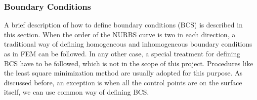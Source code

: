 \documentclass[11pt]{article}
\begin{document}
\begin{enumerate}[leftmargin=*]
	
	\begin{verbatim}

	\end{verbatim}
\end{enumerate}
\subsubsection{Boundary Conditions}
A brief description of how to define boundary conditions (BCS) is described in this section. When the order of the NURBS curve is two in each direction, a traditional way of defining homogeneous and inhomogeneous boundary conditions as in FEM can be followed. In any other case, a special treatment for defining BCS have to be followed, which is not in the scope of this project. Procedures like the least square minimization method are usually adopted for this purpose. As discussed before, an exception is when all the control points are on the surface itself, we can use common way of defining BCS.
\end{document}
